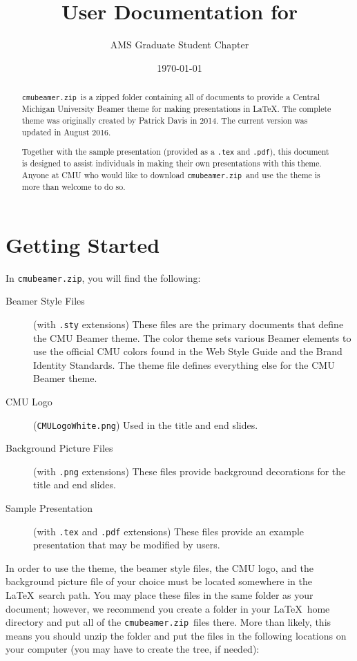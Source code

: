 \documentclass[11pt]{article}
\title{User Documentation for \zip}
\author{AMS Graduate Student Chapter}
\date{\today}
\newcommand{\zip}{\lstinline[basicstyle=\ttfamily]!cmubeamer.zip!}
\newcommand{\code}[1]{\lstinline[basicstyle=\ttfamily]!#1!}
\begin{document}
\maketitle
\begin{abstract}
\zip\ is a zipped folder containing all of documents to provide a Central Michigan University Beamer theme for making presentations in \LaTeX.  The complete theme was originally created by Patrick Davis in 2014.  The current version was updated in August 2016.

Together with the sample presentation (provided as a \code{.tex} and \code{.pdf}), this document is designed to assist individuals in making their own presentations with this theme.  Anyone at CMU who would like to download \zip\ and use the theme is more than welcome to do so.
\end{abstract}

\tableofcontents

\section*{Getting Started}

In \zip, you will find the following:
\begin{description}
     \item[Beamer Style Files] (with \lstinline[basicstyle=\ttfamily]!.sty! extensions) These files are the primary documents that define the CMU Beamer theme.  The color theme sets various Beamer elements to use the official CMU colors found in the Web Style Guide and the Brand Identity Standards.  The theme file defines everything else for the CMU Beamer theme.
     
     \item[CMU Logo] (\lstinline[basicstyle=\ttfamily]!CMULogoWhite.png!) Used in the title and end slides.
     
     \item[Background Picture Files] (with \lstinline[basicstyle=\ttfamily]!.png! extensions) These files provide background decorations for the title and end slides.
     
     \item[Sample Presentation] (with \lstinline[basicstyle=\ttfamily]!.tex! and \lstinline[basicstyle=\ttfamily]!.pdf! extensions) These files provide an example presentation that may be modified by users.
\end{description}

In order to use the theme, the beamer style files, the CMU logo, and the background picture file of your choice must be located somewhere in the \LaTeX\ search path.  You may place these files in the same folder as your document; however, we recommend you create a folder in your \LaTeX\ home directory and put all of the \zip\ files there.  More than likely, this means you should unzip the folder and put the files in the following locations on your computer (you may have to create the tree, if needed):
\end{document}
